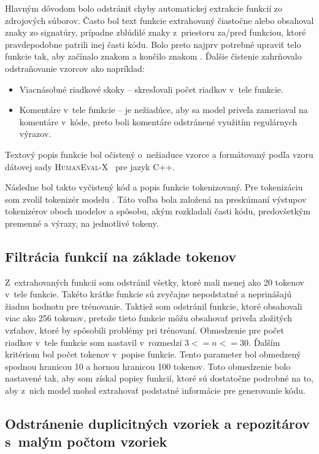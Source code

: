 Hlavným dôvodom bolo odstrániť chyby automatickej extrakcie funkcií zo zdrojových súborov. Často  bol text funkcie extrahovaný čiastočne alebo obsahoval znaky zo signatúry, prípadne zblúdilé znaky z~priestoru za/pred funkciou, ktoré pravdepodobne patrili inej časti kódu. Bolo preto najprv potrebné upraviť telo funkcie tak, aby začínalo znakom \uv{\{} a končilo znakom \uv{\}}.
Ďalšie čistenie zahrňovalo odstraňovanie vzorcov ako napríklad:
\begin{itemize}
    \item Viacnásobné riadkové skoky -- skresľovali počet riadkov v~tele funkcie.
    \item Komentáre v~tele funkcie -- je nežiadúce, aby sa model priveľa zameriaval na komentáre v~kóde, preto boli komentáre odstránené využitím regulárnych výrazov.
\end{itemize}

Textový popis funkcie bol očistený o~nežiaduce vzorce a formátovaný podľa vzoru dátovej sady \textsc{HumanEval-X}~\cite{zheng2023codegeex} pre jazyk C++.

Následne bol takto vyčistený kód a popis funkcie tokenizovaný. Pre tokenizáciu som zvolil tokenizér modelu \SC{}. Táto voľba bola založená na preskúmaní výstupov tokenizérov oboch modelov a spôsobu, akým rozkladali časti kódu, predovšetkým premenné a výrazy, na jednotlivé tokeny.
    
\subsection*{Filtrácia funkcií na základe tokenov}

Z~extrahovaných funkcií som odstránil všetky, ktoré mali menej ako 20 tokenov v~tele funkcie. Takéto krátke funkcie sú zvyčajne nepodstatné a neprinášajú žiadnu hodnotu pre trénovanie. Taktiež som odstránil funkcie, ktoré obsahovali viac ako 256 tokenov, pretože tieto funkcie môžu obsahovať priveľa zložitých vzťahov, ktoré by spôsobili problémy pri trénovaní. Obmedzenie pre počet riadkov v~tele funkcie som nastavil v~rozmedzí $3<=n<=30$. Ďalším kritériom bol počet tokenov v~popise funkcie. Tento parameter bol obmedzený spodnou hranicou 10 a hornou hranicou 100 tokenov. Toto obmedzenie bolo nastavené tak, aby som získal popisy funkcií, ktoré sú dostatočne podrobné na to, aby z~nich model mohol extrahovať podstatné informácie pre generovanie kódu.

\subsection*{Odstránenie duplicitných vzoriek a repozitárov s~malým počtom vzoriek}

